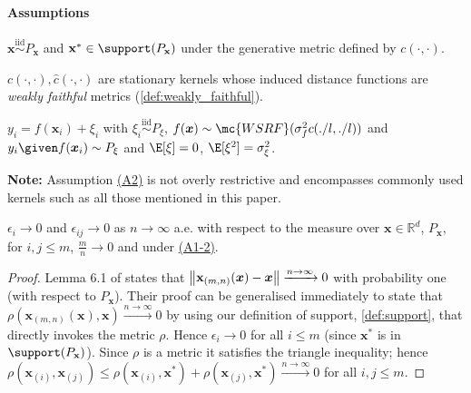 \paragraph{Assumptions}
\begin{description}[labelindent=1cm]
\label{desc:assumptions_gpnn}
    \item[(A1)\label{ass:X}] \(\mathbf{x}\overset{\textrm{iid}}{\sim}P_\mathbf{x}\) and \(\mathbf{x}^* \in \support(P_\mathbf{x})\) under the generative metric defined by \(c(\cdot,\cdot)\).
    \item[(A2)\label{ass:gpnn_k}] \(c(\cdot,\cdot),\hat{c}(\cdot,\cdot)\) are stationary kernels whose induced distance functions are \emph{weakly faithful} metrics (\autoref{def:weakly_faithful}). 
    \item[(A3)\label{ass:gpnn_y}]  \(y_i=f(\bm{x}_i) + \xi_i\) with \(\xi_i\overset{\textrm{iid}}{\sim}P_\xi\), \(f(\bm{x})\sim \mc{WSRF}(\sigma_f^2 c(./l,./l))\) and \(y_i\given f(\bm{x}_i) \sim P_\xi\) and $\E[\xi]=0$, $\E[\xi^2]=\sigma_\xi^2$.
\end{description}

\textbf{Note:} Assumption \hyperref[{desc:assumptions_gpnn}]{(A2)} is not overly restrictive and encompasses commonly used kernels such as all those mentioned in this paper.

\begin{lemma}
    \label{lem:eps_limit}
    \(\epsilon_i\rightarrow0\) and \(\epsilon_{ij}\rightarrow0\) as \(n\rightarrow\infty\) a.e. with respect to the measure over \(\mathbf{x}\in\mathbb{R}^d\), \(P_\mathbf{x}\), for \(i,j\leq m\), \(\frac{m}{n}\rightarrow0\) and under \hyperref[{desc:assumptions_gpnn}]{(A1-2)}.
\end{lemma}
\begin{proof}
    Lemma 6.1 of \cite{Gyorfi2010} states that \(\norm{\mathbf{x}_{(m,n)}(\bm{x})-\bm{x}}\xrightarrow{n\rightarrow\infty}0\) with probability one (with respect to \(P_\mathbf{x}\)). Their proof can be generalised immediately to state that \(\rho(\mathbf{x}_{(m,n)}(\bm{x}), \bm{x})\xrightarrow{n\rightarrow\infty}0\) by using our definition of support, \ref{def:support}, that directly invokes the metric \(\rho\). Hence \(\epsilon_i\rightarrow 0\) for all \(i\leq m\) (since \(\bm{x}^*\) is in \(\support(P_\mathbf{x})\)). Since \(\rho\) is a metric it satisfies the triangle inequality; hence \(\rho(\mathbf{x}_{(i)},\mathbf{x}_{(j)}) \leq \rho(\mathbf{x}_{(i)},\bm{x}^*) + \rho(\mathbf{x}_{(j)}, \bm{x}^*) \xrightarrow{n\rightarrow\infty}0\) for all \(i,j \leq m\).
\end{proof}

